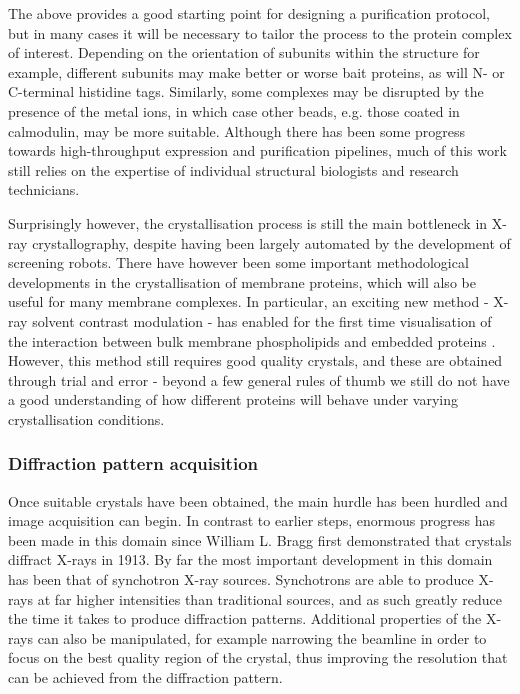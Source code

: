 \documentclass[a4paper,11pt,twoside,openright]{scrbook}
\let\cite\supercite
\begin{document}
The above provides a good starting point for designing a purification protocol, but in many cases it will be necessary to tailor the process to the protein complex of interest. Depending on the orientation of subunits within the structure for example, different subunits may make better or worse bait proteins, as will N- or C-terminal histidine tags. Similarly, some complexes may be disrupted by the presence of the metal ions, in which case other beads, e.g. those coated in calmodulin, may be more suitable. Although there has been some progress towards high-throughput expression and purification pipelines, much of this work still relies on the expertise of individual structural biologists and research technicians.

Surprisingly however, the crystallisation process is still the main bottleneck in X-ray crystallography, despite having been largely automated by the development of screening robots. There have however been some important methodological developments in the crystallisation of membrane proteins, which will also be useful for many membrane complexes. In particular, an exciting new method - X-ray solvent contrast modulation - has enabled for the first time visualisation of the interaction between bulk membrane phospholipids and embedded proteins \cite{Norimatsu2017}. However, this method still requires good quality crystals, and these are obtained through trial and error - beyond a few general rules of thumb we still do not have a good understanding of how different proteins will behave under varying crystallisation conditions.



\subsubsection{Diffraction pattern acquisition}
Once suitable crystals have been obtained, the main hurdle has been hurdled and image acquisition can begin. In contrast to earlier steps, enormous progress has been made in this domain since William L. Bragg first demonstrated that crystals diffract X-rays in 1913. By far the most important development in this domain has been that of synchotron X-ray sources. Synchotrons are able to produce X-rays at far higher intensities than traditional sources, and as such greatly reduce the time it takes to produce diffraction patterns. Additional properties of the X-rays can also be manipulated, for example narrowing the beamline in order to focus on the best quality region of the crystal, thus improving the resolution that can be achieved from the diffraction pattern.
\end{document}
